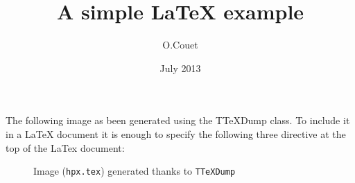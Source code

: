 \documentclass{article}
\title{A simple LaTeX example}
\date{July 2013}
\author{O.Couet}
\begin{document}
\maketitle
The following image as been generated using the TTeXDump class.
To include it in a LaTeX document it is enough to specify the following
three directive at the top of the LaTex document:

\begin{figure}[htbp]
\begin{center}
\scalebox{0.5}{}
\caption{Image ({\tt hpx.tex}) generated thanks to {\tt TTeXDump}}
\end{center}
\end{figure}
\end{document}
